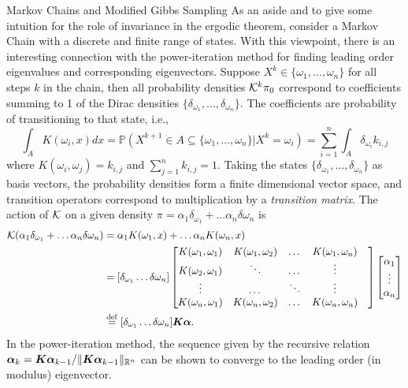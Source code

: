 \begin{chapter}{Markov Chains and Modified Gibbs Sampling}
As an aside and to give some intuition for the role of invariance in the ergodic theorem, consider a Markov Chain with a discrete and finite range of states.
With this viewpoint, there is an interesting connection with the power-iteration method for finding leading order eigenvalues and corresponding eigenvectors.
Suppose $X^k \in \{\omega_1,\dots,\omega_n\}$ for all steps $k$ in the chain, then all probability densities $\mathcal K^k \pi_0$ correspond to coefficients summing to 1 of the Dirac densities $\{\delta_{\omega_1},\dots,\delta_{\omega_n}\}$.
The coefficients are probability of transitioning to that state, i.e.,
\begin{equation}
  \int_A K(\omega_i,x)dx = \mathbb P( X^{k+1} \in A \subseteq \{\omega_1,\dots,\omega_n\}| X^k = \omega_{i} ) = \sum_{i=1}^n \int_A \delta_{\omega_i}k_{i,j}
\end{equation}
where $K(\omega_i,\omega_j) = k_{i,j}$ and $\sum_{j=1}^n k_{i,j} = 1$.
Taking the states $\{\delta_{\omega_1},\dots,\delta_{\omega_n}\}$ as basis vectors, the probability densities form a finite dimensional vector space, and transition operators correspond to multiplication by a \emph{transition matrix}.
The action of $\mathcal K$ on a given density $\pi = \alpha_1\delta_{\omega_1} + \dots \alpha_n\delta{\omega_n}$ is
\begin{align}
  \mathcal K (\alpha_1\delta_{\omega_1} + \dots \alpha_n\delta{\omega_n})
    &= \alpha_1K(\omega_1,x) + \dots \alpha_nK(\omega_n,x)\nonumber\\
    &= [\delta_{\omega_1}\dots \delta{\omega_n}]
    \begin{bmatrix}
      K(\omega_1,\omega_1) & K(\omega_1,\omega_2) & \dots & K(\omega_1,\omega_n)\\
      K(\omega_2,\omega_1) & \ddots & \dots & \vdots &\\
      \vdots & \dots & \ddots & \vdots &\\
      K(\omega_n,\omega_1) & K(\omega_n,\omega_2) & \dots & K(\omega_n,\omega_n)\\
    \end{bmatrix}
    \begin{bmatrix}
      \alpha_1\\
      \vdots\\
      \alpha_n
    \end{bmatrix}\nonumber\\
    &\stackrel{\rm def}{=} [\delta_{\omega_1}\dots \delta{\omega_n}]\mbox{\boldmath$K$}\mbox{\boldmath$\alpha$}.
\end{align}
In the power-iteration method, the sequence given by the recursive relation $\mbox{\boldmath$\alpha$}_k = \mbox{\boldmath$K$}\mbox{\boldmath$\alpha$}_{k-1}/\|\mbox{\boldmath$K$}\mbox{\boldmath$\alpha$}_{k-1}\|_{\mathbb R^n}$ can be shown to converge to the leading order (in modulus) eigenvector. 

\end{chapter}
